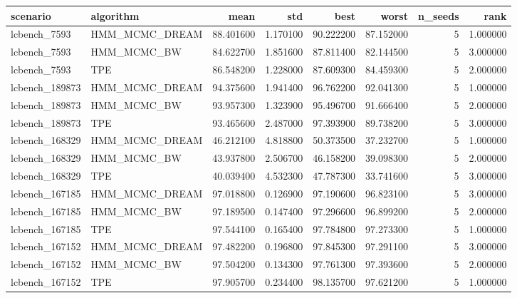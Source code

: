 \begin{tabular}{llrrrrrr}
\toprule
scenario & algorithm & mean & std & best & worst & n\_seeds & rank \\
\midrule
lcbench\_7593 & HMM\_MCMC\_DREAM & 88.401600 & 1.170100 & 90.222200 & 87.152000 & 5 & 1.000000 \\
lcbench\_7593 & HMM\_MCMC\_BW & 84.622700 & 1.851600 & 87.811400 & 82.144500 & 5 & 3.000000 \\
lcbench\_7593 & TPE & 86.548200 & 1.228000 & 87.609300 & 84.459300 & 5 & 2.000000 \\
lcbench\_189873 & HMM\_MCMC\_DREAM & 94.375600 & 1.941400 & 96.762200 & 92.041300 & 5 & 1.000000 \\
lcbench\_189873 & HMM\_MCMC\_BW & 93.957300 & 1.323900 & 95.496700 & 91.666400 & 5 & 2.000000 \\
lcbench\_189873 & TPE & 93.465600 & 2.487000 & 97.393900 & 89.738200 & 5 & 3.000000 \\
lcbench\_168329 & HMM\_MCMC\_DREAM & 46.212100 & 4.818800 & 50.373500 & 37.232700 & 5 & 1.000000 \\
lcbench\_168329 & HMM\_MCMC\_BW & 43.937800 & 2.506700 & 46.158200 & 39.098300 & 5 & 2.000000 \\
lcbench\_168329 & TPE & 40.039400 & 4.532300 & 47.787300 & 33.741600 & 5 & 3.000000 \\
lcbench\_167185 & HMM\_MCMC\_DREAM & 97.018800 & 0.126900 & 97.190600 & 96.823100 & 5 & 3.000000 \\
lcbench\_167185 & HMM\_MCMC\_BW & 97.189500 & 0.147400 & 97.296600 & 96.899200 & 5 & 2.000000 \\
lcbench\_167185 & TPE & 97.544100 & 0.165400 & 97.784800 & 97.273300 & 5 & 1.000000 \\
lcbench\_167152 & HMM\_MCMC\_DREAM & 97.482200 & 0.196800 & 97.845300 & 97.291100 & 5 & 3.000000 \\
lcbench\_167152 & HMM\_MCMC\_BW & 97.504200 & 0.134300 & 97.761300 & 97.393600 & 5 & 2.000000 \\
lcbench\_167152 & TPE & 97.905700 & 0.234400 & 98.135700 & 97.621200 & 5 & 1.000000 \\
\bottomrule
\end{tabular}
